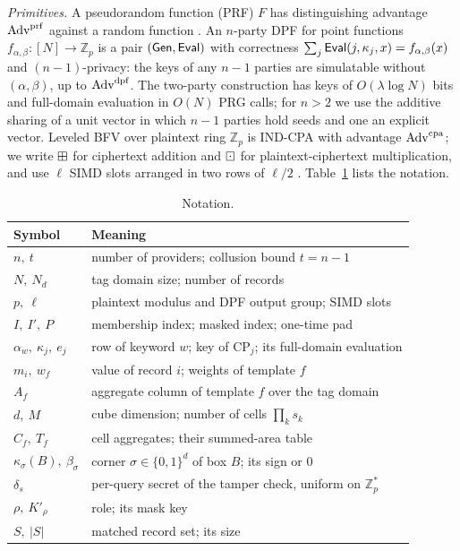 \emph{Primitives.} A pseudorandom function (PRF) $F$ has distinguishing
advantage $\mathrm{Adv}^{\mathrm{prf}}$ against a random function \citep{goldreich2019construct}.
An $n$-party DPF \citep{gilboa2014distributed,boyle2015function,boyle2016function}
for point functions $f_{\alpha,\beta}:[N]\to\mathbb{Z}_p$ is a pair
$(\mathsf{Gen},\mathsf{Eval})$ with correctness $\sum_j\mathsf{Eval}(j,\kappa_j,x)=f_{\alpha,\beta}(x)$
and $(n{-}1)$-privacy: the keys of any $n-1$ parties are simulatable without
$(\alpha,\beta)$, up to $\mathrm{Adv}^{\mathrm{dpf}}$. The two-party construction has keys of
$O(\lambda\log N)$ bits and full-domain evaluation in $O(N)$ PRG calls; for
$n>2$ we use the additive sharing of a unit vector in which $n-1$ parties hold
seeds and one an explicit vector. Leveled BFV
\citep{fan2012somewhat,cryptoeprint:2016/421} over plaintext ring
$\mathbb{Z}_p$ is IND-CPA with advantage $\mathrm{Adv}^{\mathrm{cpa}}$; we write $\boxplus$ for
ciphertext addition and $\boxdot$ for plaintext-ciphertext multiplication, and
use $\ell$ SIMD slots arranged in two rows of $\ell/2$
\citep{halevi2014algorithms}. Table~\ref{tab:notation} lists the notation.

\begin{table}[pos=htbp]
\caption{Notation.}
\label{tab:notation}
\centering
\footnotesize
\begin{tabular}{@{}ll@{}}
\toprule
Symbol & Meaning \\
\midrule
$n,\ t$ & number of providers; collusion bound $t=n-1$ \\
$N,\ N_d$ & tag domain size; number of records \\
$p,\ \ell$ & plaintext modulus and DPF output group; SIMD slots \\
$I,\ I',\ P$ & membership index; masked index; one-time pad \\
$\alpha_w,\ \kappa_j,\ e_j$ & row of keyword $w$; key of $\text{CP}_j$; its full-domain evaluation \\
$m_i,\ w_f$ & value of record $i$; weights of template $f$ \\
$A_f$ & aggregate column of template $f$ over the tag domain \\
$d,\ M$ & cube dimension; number of cells $\prod_k s_k$ \\
$C_f,\ T_f$ & cell aggregates; their summed-area table \\
$\kappa_\sigma(B),\ \beta_\sigma$ & corner $\sigma\in\{0,1\}^d$ of box $B$; its sign or $0$ \\
$\delta_s$ & per-query secret of the tamper check, uniform on $\mathbb{Z}_p^{*}$ \\
$\rho,\ K'_\rho$ & role; its mask key \\
$S,\ |S|$ & matched record set; its size \\
\bottomrule
\end{tabular}
\end{table}


